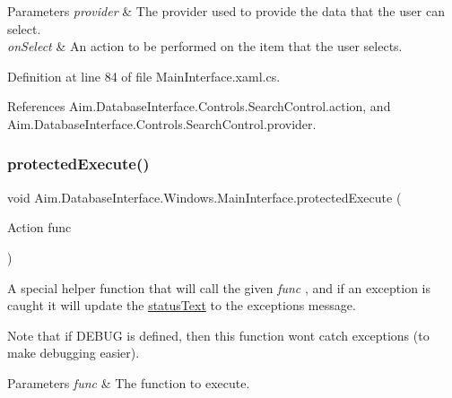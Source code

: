 \begin{DoxyParams}{Parameters}
{\em provider} & The provider used to provide the data that the user can select.\\
\hline
{\em on\+Select} & An action to be performed on the item that the user selects.\\
\hline
\end{DoxyParams}


Definition at line 84 of file Main\+Interface.\+xaml.\+cs.



References Aim.\+Database\+Interface.\+Controls.\+Search\+Control.\+action, and Aim.\+Database\+Interface.\+Controls.\+Search\+Control.\+provider.

\mbox{\label{class_aim_1_1_database_interface_1_1_windows_1_1_main_interface_af58ec09a0ee270884c6428192ea96347}} 
\subsubsection{\texorpdfstring{protected\+Execute()}{protectedExecute()}}
{\footnotesize\ttfamily void Aim.\+Database\+Interface.\+Windows.\+Main\+Interface.\+protected\+Execute (\begin{DoxyParamCaption}\item[{Action}]{func }\end{DoxyParamCaption})\hspace{0.3cm}{\ttfamily [inline]}}



A special helper function that will call the given {\itshape func} , and if an exception is caught it will update the \mbox{\hyperlink{class_aim_1_1_database_interface_1_1_windows_1_1_main_interface_ab2ea5e6fe7f1a5f7691ae78883bc384e}{status\+Text}} to the exception\textquotesingle{}s message. 

Note that if \textquotesingle{}D\+E\+B\+UG\textquotesingle{} is defined, then this function won\textquotesingle{}t catch exceptions (to make debugging easier). 


\begin{DoxyParams}{Parameters}
{\em func} & The function to execute.\\
\hline
\end{DoxyParams}


